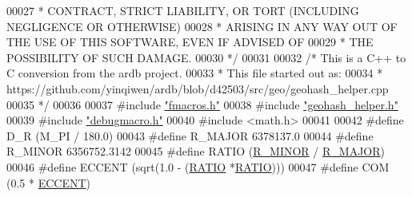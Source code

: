 \begin{DoxyCode}
00027 \textcolor{comment}{ * CONTRACT, STRICT LIABILITY, OR TORT (INCLUDING NEGLIGENCE OR OTHERWISE)}
00028 \textcolor{comment}{ * ARISING IN ANY WAY OUT OF THE USE OF THIS SOFTWARE, EVEN IF ADVISED OF}
00029 \textcolor{comment}{ * THE POSSIBILITY OF SUCH DAMAGE.}
00030 \textcolor{comment}{ */}
00031 
00032 \textcolor{comment}{/* This is a C++ to C conversion from the ardb project.}
00033 \textcolor{comment}{ * This file started out as:}
00034 \textcolor{comment}{ * https://github.com/yinqiwen/ardb/blob/d42503/src/geo/geohash\_helper.cpp}
00035 \textcolor{comment}{ */}
00036 
00037 \textcolor{preprocessor}{#}\textcolor{preprocessor}{include} \hyperlink{fmacros_8h}{"fmacros.h"}
00038 \textcolor{preprocessor}{#}\textcolor{preprocessor}{include} \hyperlink{geohash__helper_8h}{"geohash\_helper.h"}
00039 \textcolor{preprocessor}{#}\textcolor{preprocessor}{include} \hyperlink{debugmacro_8h}{"debugmacro.h"}
00040 \textcolor{preprocessor}{#}\textcolor{preprocessor}{include} \textcolor{preprocessor}{<}\textcolor{preprocessor}{math}\textcolor{preprocessor}{.}\textcolor{preprocessor}{h}\textcolor{preprocessor}{>}
00041 
00042 \textcolor{preprocessor}{#}\textcolor{preprocessor}{define} \textcolor{preprocessor}{D\_R} \textcolor{preprocessor}{(}M\_PI \textcolor{preprocessor}{/} 180.0\textcolor{preprocessor}{)}
00043 \textcolor{preprocessor}{#}\textcolor{preprocessor}{define} \textcolor{preprocessor}{R\_MAJOR} 6378137.0
00044 \textcolor{preprocessor}{#}\textcolor{preprocessor}{define} \textcolor{preprocessor}{R\_MINOR} 6356752.3142
00045 \textcolor{preprocessor}{#}\textcolor{preprocessor}{define} \textcolor{preprocessor}{RATIO} \textcolor{preprocessor}{(}\hyperlink{geohash__helper_8c_aaed2746737d8a4ae298ef4c61d58a1eb}{R\_MINOR} \textcolor{preprocessor}{/} \hyperlink{geohash__helper_8c_a829002fc4dfdb3d37fa2d2e8ca61d2cf}{R\_MAJOR}\textcolor{preprocessor}{)}
00046 \textcolor{preprocessor}{#}\textcolor{preprocessor}{define} \textcolor{preprocessor}{ECCENT} \textcolor{preprocessor}{(}\textcolor{preprocessor}{sqrt}\textcolor{preprocessor}{(}1.0 \textcolor{preprocessor}{-} \textcolor{preprocessor}{(}\hyperlink{geohash__helper_8c_a7e8b3c8482e593df0ace933ad3de22ee}{RATIO} \textcolor{preprocessor}{*}\hyperlink{geohash__helper_8c_a7e8b3c8482e593df0ace933ad3de22ee}{RATIO}\textcolor{preprocessor}{)}\textcolor{preprocessor}{)}\textcolor{preprocessor}{)}
00047 \textcolor{preprocessor}{#}\textcolor{preprocessor}{define} \textcolor{preprocessor}{COM} \textcolor{preprocessor}{(}0.5 \textcolor{preprocessor}{*} \hyperlink{geohash__helper_8c_a6e8637818fcb5466c85681cabd563e88}{ECCENT}\textcolor{preprocessor}{)}

\end{DoxyCode}
